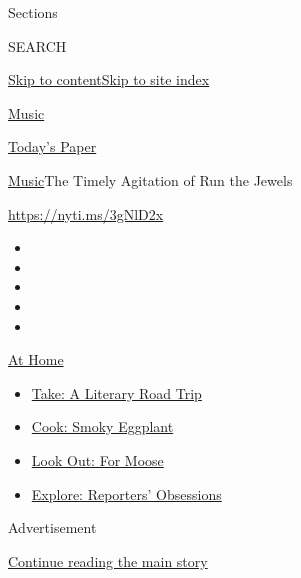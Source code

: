 Sections

SEARCH

\protect\hyperlink{site-content}{Skip to
content}\protect\hyperlink{site-index}{Skip to site index}

\href{https://www.nytimes.com/section/arts/music}{Music}

\href{https://myaccount.nytimes.com/auth/login?response_type=cookie\&client_id=vi}{}

\href{https://www.nytimes.com/section/todayspaper}{Today's Paper}

\href{/section/arts/music}{Music}\textbar{}The Timely Agitation of Run
the Jewels

\url{https://nyti.ms/3gNlD2x}

\begin{itemize}
\item
\item
\item
\item
\item
\end{itemize}

\href{https://www.nytimes.com/spotlight/at-home?action=click\&pgtype=Article\&state=default\&region=TOP_BANNER\&context=at_home_menu}{At
Home}

\begin{itemize}
\tightlist
\item
  \href{https://www.nytimes.com/2020/07/28/books/time-for-a-literary-road-trip.html?action=click\&pgtype=Article\&state=default\&region=TOP_BANNER\&context=at_home_menu}{Take:
  A Literary Road Trip}
\item
  \href{https://www.nytimes.com/2020/07/29/magazine/bored-with-your-home-cooking-some-smoky-eggplant-will-fix-that.html?action=click\&pgtype=Article\&state=default\&region=TOP_BANNER\&context=at_home_menu}{Cook:
  Smoky Eggplant}
\item
  \href{https://www.nytimes.com/2020/07/27/travel/moose-michigan-isle-royale.html?action=click\&pgtype=Article\&state=default\&region=TOP_BANNER\&context=at_home_menu}{Look
  Out: For Moose}
\item
  \href{https://www.nytimes.com/interactive/2020/at-home/even-more-reporters-editors-diaries-lists-recommendations.html?action=click\&pgtype=Article\&state=default\&region=TOP_BANNER\&context=at_home_menu}{Explore:
  Reporters' Obsessions}
\end{itemize}

Advertisement

\protect\hyperlink{after-top}{Continue reading the main story}

